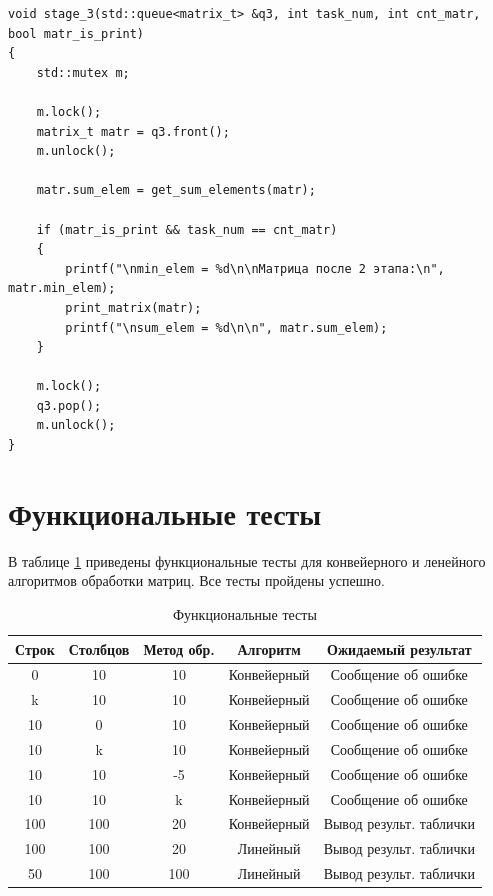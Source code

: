 \documentclass[a4paper,14pt, unknownkeysallowed]{extreport}
\begin{document}
\clearpage

\begin{center}
\captionsetup{justification=raggedright,singlelinecheck=off}
\begin{lstlisting}[label=lst:stage_3,caption=Функция реализации 3-его этапа обработки матрицы]
void stage_3(std::queue<matrix_t> &q3, int task_num, int cnt_matr, bool matr_is_print)
{
	std::mutex m;

	m.lock();
	matrix_t matr = q3.front();
	m.unlock();

	matr.sum_elem = get_sum_elements(matr);
	
	if (matr_is_print && task_num == cnt_matr)
	{
		printf("\nmin_elem = %d\n\nМатрица после 2 этапа:\n", matr.min_elem);        
		print_matrix(matr);
		printf("\nsum_elem = %d\n\n", matr.sum_elem);
	}

	m.lock();
	q3.pop();
	m.unlock();
}
\end{lstlisting}
\end{center}

\clearpage

\section{Функциональные тесты}

В таблице \ref{tbl:functional_test} приведены функциональные тесты для конвейерного и ленейного алгоритмов обработки матриц. Все тесты пройдены успешно.

\begin{table}[h]
	\begin{center}
	\begin{threeparttable}
		\captionsetup{justification=raggedright,singlelinecheck=off}
		\caption{\label{tbl:functional_test} Функциональные тесты}
		\begin{tabular}{|c|c|c|c|c|}
			\hline
			Строк & Столбцов & Метод обр. & Алгоритм & Ожидаемый результат 
			\\ \hline
			0 & 10 & 10 & Конвейерный & Сообщение об ошибке 
			\\ \hline
			k & 10 & 10 & Конвейерный & Сообщение об ошибке 
			\\ \hline
			10 & 0 & 10 & Конвейерный & Сообщение об ошибке 
			\\ \hline
			10 & k & 10 & Конвейерный & Сообщение об ошибке 
			\\ \hline
			10 & 10 & -5 & Конвейерный & Сообщение об ошибке 
			\\ \hline
			10 & 10 & k & Конвейерный & Сообщение об ошибке 
			\\ \hline
			100 & 100 & 20 & Конвейерный & Вывод результ. таблички
			\\ \hline
			100 & 100 & 20 & Линейный & Вывод результ. таблички
			\\ \hline
			50 & 100 & 100 & Линейный & Вывод результ. таблички
			\\ \hline
		\end{tabular}
	\end{threeparttable}
	\end{center}
\end{table}
\end{document}
